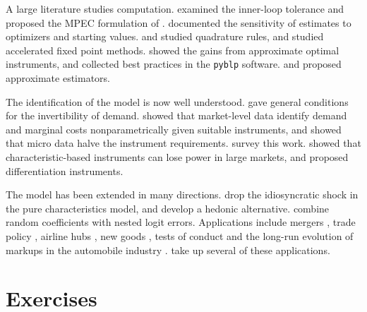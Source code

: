 A large literature studies computation. \citet{DubeFoxSu2012} examined the inner-loop tolerance and proposed the
MPEC formulation of \citet{SuJudd2012}. \citet{KnittelMetaxoglou2014} documented the sensitivity of estimates to
optimizers and starting values. \citet{SkrainkaJudd2011} and \citet{HeissWinschel2008} studied quadrature rules,
and \citet{ReynaertsVaradhanNash2012} studied accelerated fixed point methods. \citet{ReynaertVerboven2014}
showed the gains from approximate optimal instruments, and \citet{ConlonGortmaker2020} collected best practices in
the \texttt{pyblp} software. \citet{LeeSeo2015} and \citet{SalanieWolak2019} proposed approximate estimators.

The identification of the model is now well understood. \citet{BerryGandhiHaile2013} gave general conditions for
the invertibility of demand. \citet{BerryHaile2014} showed that market-level data identify demand and marginal
costs nonparametrically given suitable instruments, and \citet{BerryHaile2024} showed that micro data halve the
instrument requirements. \citet{BerryHaile2021} survey this work. \citet{Armstrong2016} showed that
characteristic-based instruments can lose power in large markets, and \citet{GandhiHoude2019} proposed
differentiation instruments.

The model has been extended in many directions. \citet{BerryPakes2007} drop the idiosyncratic shock in the pure
characteristics model, and \citet{BajariBenkard2005} develop a hedonic alternative. \citet{GrigolonVerboven2014}
combine random coefficients with nested logit errors. Applications include mergers \citep{Nevo2000b}, trade policy
\citep{Goldberg1995,BerryLevinsohnPakes1999}, airline hubs \citep{BerryCarnallSpiller2006}, new goods
\citep{Petrin2002}, tests of conduct \citep{BackusConlonSinkinson2021} and the long-run evolution of markups in the
automobile industry \citep{GriecoMurryYurukoglu2024}.  take up several of
these applications.

\section{Exercises}\label{sec:08-exercises}

